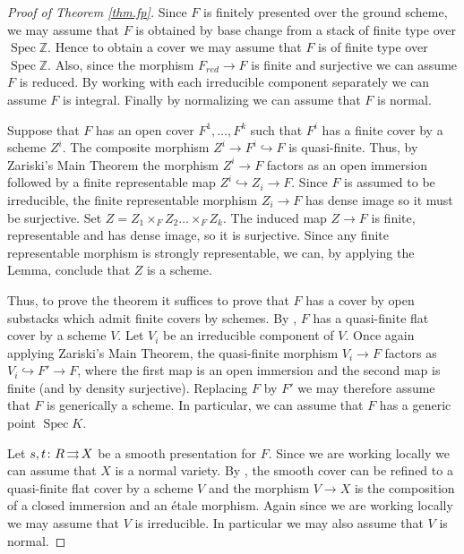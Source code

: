 \documentclass[12pt]{amsart}
\newcommand{\Z}{{\mathbb Z}}
\newcommand{\toto}{\operatornamewithlimits{\rightrightarrows}}
\DeclareMathOperator{\spec}{Spec}
\theoremstyle{plain}
\theoremstyle{definition}
\theoremstyle{remark}
\begin{document}
\begin{proof}[Proof of Theorem \ref{thm.fp}]
Since $F$ is finitely presented
over the ground scheme, we may assume that $F$ is obtained
by base change from a stack of finite type over $\spec \Z$. Hence
to obtain a cover we may assume that $F$ is of finite type over
$\spec \Z$.
Also, since the morphism $F_{red} \rightarrow F$ is finite and surjective 
we can assume $F$ is reduced.
By working with each irreducible component separately we can
assume $F$ is integral. Finally by normalizing we can assume 
that $F$ is normal.

Suppose that $F$ has an open cover $F^1, \ldots, F^k$ such
that $F^i$ has a finite cover by a scheme $Z^i$.
The composite morphism $Z^i \rightarrow F^i \hookrightarrow F$
is quasi-finite. Thus, by 
Zariski's Main Theorem \cite[Theorem 16.5]{L-MB}
the morphism $Z^i \rightarrow F$
factors as an open immersion followed by a finite representable 
map $Z^i \hookrightarrow
Z_i \rightarrow F$. Since $F$ is assumed to be irreducible,
the finite representable morphism 
$Z_i \rightarrow F$ has dense image so it must be surjective.
Set $Z = Z_1 \times_F Z_2 \ldots \times_F Z_k$.
The induced map $Z \rightarrow F$ is finite, representable
and has dense image, so it is surjective. Since
any finite representable morphism is strongly representable, we
can, by applying the Lemma,
conclude that $Z$ is a scheme.

Thus, to prove the theorem it suffices to prove that
$F$ has a cover by open substacks which admit finite covers
by schemes. By \cite[Lemma 3.3.1]{KM}, $F$ has a quasi-finite flat
cover by a scheme $V$. Let $V_i$ be an irreducible component
of $V$. Once again applying Zariski's Main Theorem, 
the quasi-finite morphism $V_i \rightarrow F$ factors
as $V_i \hookrightarrow F' \rightarrow F$, where the 
first map is an open immersion and the second map is
finite (and by density surjective). Replacing $F$ by $F'$
we may therefore assume that $F$ is generically a scheme.
In particular, we can assume that $F$ has a generic point $\spec K$.

Let $s,t\colon R\toto X$ be a smooth presentation for $F$. Since
we are working locally we can assume that $X$ is a normal
variety.
By \cite[Lemma 3.3.1]{KM}, the smooth cover can be refined
to
a quasi-finite flat cover by a scheme $V$ 
and the morphism $V \rightarrow X$ is the composition
of a closed immersion and an \'etale morphism. 
Again since we are working locally we may assume that $V$ is
irreducible. In particular we may also
assume that $V$ is normal. 



\end{proof}
\end{document}
